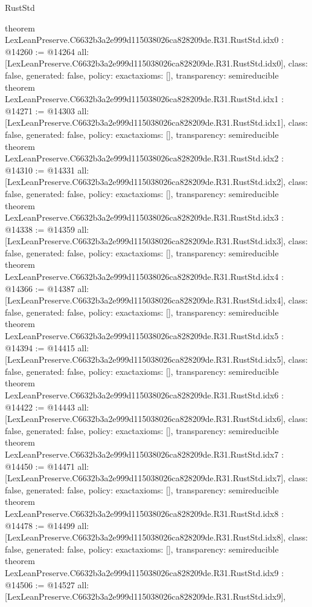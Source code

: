 \begin{lexlean}{RustStd}
\begin{coremodule}
{}
theorem LexLeanPreserve.C6632b3a2e999d115038026ca828209de.R31.RustStd.idx0 : @14260 := @14264 {
  all: [LexLeanPreserve.C6632b3a2e999d115038026ca828209de.R31.RustStd.idx0],
  class: false,
  generated: false,
  policy: exact{axioms: []},
  transparency: semireducible
}
theorem LexLeanPreserve.C6632b3a2e999d115038026ca828209de.R31.RustStd.idx1 : @14271 := @14303 {
  all: [LexLeanPreserve.C6632b3a2e999d115038026ca828209de.R31.RustStd.idx1],
  class: false,
  generated: false,
  policy: exact{axioms: []},
  transparency: semireducible
}
theorem LexLeanPreserve.C6632b3a2e999d115038026ca828209de.R31.RustStd.idx2 : @14310 := @14331 {
  all: [LexLeanPreserve.C6632b3a2e999d115038026ca828209de.R31.RustStd.idx2],
  class: false,
  generated: false,
  policy: exact{axioms: []},
  transparency: semireducible
}
theorem LexLeanPreserve.C6632b3a2e999d115038026ca828209de.R31.RustStd.idx3 : @14338 := @14359 {
  all: [LexLeanPreserve.C6632b3a2e999d115038026ca828209de.R31.RustStd.idx3],
  class: false,
  generated: false,
  policy: exact{axioms: []},
  transparency: semireducible
}
theorem LexLeanPreserve.C6632b3a2e999d115038026ca828209de.R31.RustStd.idx4 : @14366 := @14387 {
  all: [LexLeanPreserve.C6632b3a2e999d115038026ca828209de.R31.RustStd.idx4],
  class: false,
  generated: false,
  policy: exact{axioms: []},
  transparency: semireducible
}
theorem LexLeanPreserve.C6632b3a2e999d115038026ca828209de.R31.RustStd.idx5 : @14394 := @14415 {
  all: [LexLeanPreserve.C6632b3a2e999d115038026ca828209de.R31.RustStd.idx5],
  class: false,
  generated: false,
  policy: exact{axioms: []},
  transparency: semireducible
}
theorem LexLeanPreserve.C6632b3a2e999d115038026ca828209de.R31.RustStd.idx6 : @14422 := @14443 {
  all: [LexLeanPreserve.C6632b3a2e999d115038026ca828209de.R31.RustStd.idx6],
  class: false,
  generated: false,
  policy: exact{axioms: []},
  transparency: semireducible
}
theorem LexLeanPreserve.C6632b3a2e999d115038026ca828209de.R31.RustStd.idx7 : @14450 := @14471 {
  all: [LexLeanPreserve.C6632b3a2e999d115038026ca828209de.R31.RustStd.idx7],
  class: false,
  generated: false,
  policy: exact{axioms: []},
  transparency: semireducible
}
theorem LexLeanPreserve.C6632b3a2e999d115038026ca828209de.R31.RustStd.idx8 : @14478 := @14499 {
  all: [LexLeanPreserve.C6632b3a2e999d115038026ca828209de.R31.RustStd.idx8],
  class: false,
  generated: false,
  policy: exact{axioms: []},
  transparency: semireducible
}
theorem LexLeanPreserve.C6632b3a2e999d115038026ca828209de.R31.RustStd.idx9 : @14506 := @14527 {
  all: [LexLeanPreserve.C6632b3a2e999d115038026ca828209de.R31.RustStd.idx9],
}
\end{coremodule}
\end{lexlean}
